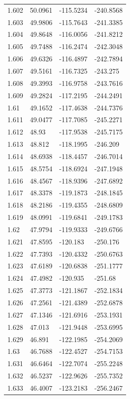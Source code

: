 \begin{tabular}{llll}
1.602 & 50.0961 & -115.5234 & -240.8568 \\
1.603 & 49.9806 & -115.7643 & -241.3385 \\
1.604 & 49.8648 & -116.0056 & -241.8212 \\
1.605 & 49.7488 & -116.2474 & -242.3048 \\
1.606 & 49.6326 & -116.4897 & -242.7894 \\
1.607 & 49.5161 & -116.7325 & -243.275 \\
1.608 & 49.3993 & -116.9758 & -243.7616 \\
1.609 & 49.2824 & -117.2195 & -244.2491 \\
1.61 & 49.1652 & -117.4638 & -244.7376 \\
1.611 & 49.0477 & -117.7085 & -245.2271 \\
1.612 & 48.93 & -117.9538 & -245.7175 \\
1.613 & 48.812 & -118.1995 & -246.209 \\
1.614 & 48.6938 & -118.4457 & -246.7014 \\
1.615 & 48.5754 & -118.6924 & -247.1948 \\
1.616 & 48.4567 & -118.9396 & -247.6892 \\
1.617 & 48.3378 & -119.1873 & -248.1845 \\
1.618 & 48.2186 & -119.4355 & -248.6809 \\
1.619 & 48.0991 & -119.6841 & -249.1783 \\
1.62 & 47.9794 & -119.9333 & -249.6766 \\
1.621 & 47.8595 & -120.183 & -250.176 \\
1.622 & 47.7393 & -120.4332 & -250.6763 \\
1.623 & 47.6189 & -120.6838 & -251.1777 \\
1.624 & 47.4982 & -120.935 & -251.68 \\
1.625 & 47.3773 & -121.1867 & -252.1834 \\
1.626 & 47.2561 & -121.4389 & -252.6878 \\
1.627 & 47.1346 & -121.6916 & -253.1931 \\
1.628 & 47.013 & -121.9448 & -253.6995 \\
1.629 & 46.891 & -122.1985 & -254.2069 \\
1.63 & 46.7688 & -122.4527 & -254.7153 \\
1.631 & 46.6464 & -122.7074 & -255.2248 \\
1.632 & 46.5237 & -122.9626 & -255.7352 \\
1.633 & 46.4007 & -123.2183 & -256.2467 \\

\end{tabular}

